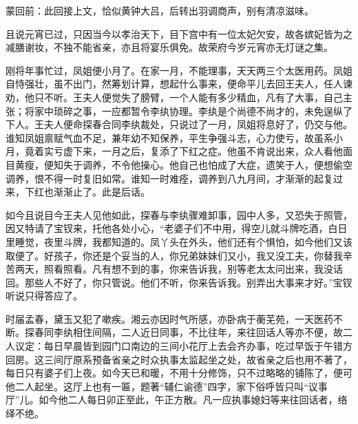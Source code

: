 
\begin{parag}
    \begin{note}蒙回前：此回接上文，恰似黄钟大吕，后转出羽调商声，别有清凉滋味。\end{note}
\end{parag}


\begin{parag}
    且说元宵已过，只因当今以孝治天下，目下宫中有一位太妃欠安，故各嫔妃皆为之减膳谢妆，不独不能省亲，亦且将宴乐俱免。故荣府今岁元宵亦无灯谜之集。
\end{parag}


\begin{parag}
    刚将年事忙过，凤姐便小月了。在家一月，不能理事，天天两三个太医用药。凤姐自恃强壮，虽不出门，然筹划计算，想起什么事来，便命平儿去回王夫人，任人谏劝，他只不听。王夫人便觉失了膀臂，一个人能有多少精血，凡有了大事，自己主张；将家中琐碎之事，一应都暂令李纨协理。李纨是个尚德不尚才的，未免逞纵了下人。王夫人便命探春合同李纨裁处，只说过了一月，凤姐将息好了，仍交与他。谁知凤姐禀赋气血不足，兼年幼不知保养，平生争强斗志，心力使亏，故虽系小月，竟着实亏虚下来，一月之后，复添了下红之症。他虽不肯说出来，众人看他面目黄瘦，便知失于调养，不令他操心。他自己也怕成了大症，遗笑于人，便想偷空调养，恨不得一时复旧如常。谁知一时难痊，调养到八九月间，才渐渐的起复过来，下红也渐渐止了。此是后话。
\end{parag}


\begin{parag}
    如今且说目今王夫人见他如此，探春与李纨骤难卸事，园中人多，又恐失于照管，因又特请了宝钗来，托他各处小心，“老婆子们不中用，得空儿就斗牌吃酒，白日里睡觉，夜里斗牌，我都知道的。凤丫头在外头，他们还有个惧怕，如今他们又该取便了。好孩子，你还是个妥当的人，你兄弟妹妹们又小，我又没工夫，你替我辛苦两天，照看照看。凡有想不到的事，你来告诉我，别等老太太问出来，我没话回。那些人不好了，你只管说。他们不听，你来告诉我。别弄出大事来才好。”宝钗听说只得答应了。
\end{parag}


\begin{parag}
    时届孟春，黛玉又犯了嗽疾。湘云亦因时气所感，亦卧病于蘅芜苑，一天医药不断。探春同李纨相住间隔，二人近日同事，不比往年，来往回话人等亦不便，故二人议定：每日早晨皆到园门口南边的三间小花厅上去会齐办事，吃过早饭于午错方回房。这三间厅原系预备省亲之时众执事太监起坐之处，故省亲之后也用不著了，每日只有婆子们上夜。如今天已和暖，不用十分修饰，只不过略略的铺陈了，便可他二人起坐。这厅上也有一匾，题著“辅仁谕德”四字，家下俗呼皆只叫“议事厅”儿。如今他二人每日卯正至此，午正方散。凡一应执事媳妇等来往回话者，络绎不绝。
\end{parag}


